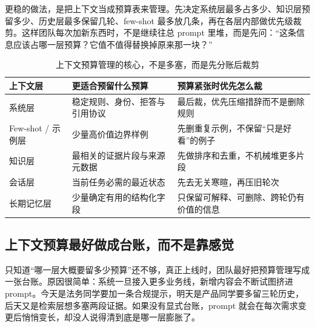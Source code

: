 更稳的做法，是把上下文当成预算表来管理。先决定系统层最多占多少、知识层预留多少、历史层最多保留几轮、few-shot 最多放几条，再在各层内部做优先级裁剪。这样团队每次加新东西时，不是继续往总 prompt 里堆，而是先问：“这条信息应该占哪一层预算？它值不值得替换掉原来那一块？”

\begin{table}[H]
\centering
\small
\begin{tabularx}{\textwidth}{>{\raggedright\arraybackslash}p{2.8cm}>{\raggedright\arraybackslash}p{3.1cm}>{\raggedright\arraybackslash}X}
\toprule
\textbf{上下文层} & \textbf{更适合预留什么预算} & \textbf{预算紧张时优先怎么裁} \\
\midrule
系统层 & 稳定规则、身份、拒答与引用协议 & 最后裁，优先压缩措辞而不是删除规则 \\
Few-shot / 示例层 & 少量高价值边界样例 & 先删重复示例，不保留“只是好看”的例子 \\
知识层 & 最相关的证据片段与来源元数据 & 先做排序和去重，不机械堆更多片段 \\
会话层 & 当前任务必需的最近状态 & 先去无关寒暄，再压旧轮次 \\
长期记忆层 & 少量确定有用的结构化字段 & 只保留可解释、可删除、跨轮仍有价值的信息 \\
\bottomrule
\end{tabularx}
\caption{上下文预算管理的核心，不是多塞，而是先分账后裁剪}
\label{tab:context-budget-allocation}
\end{table}

\subsection{上下文预算最好做成台账，而不是靠感觉}
只知道“哪一层大概要留多少预算”还不够，真正上线时，团队最好把预算管理写成一张台账。原因很简单：系统一旦接入更多业务线，新增内容会不断试图挤进 prompt。今天是法务同学要加一条合规提示，明天是产品同学要多留三轮历史，后天又是检索层想多塞两段证据。如果没有显式台账，prompt 就会在每次需求变更后悄悄变长，却没人说得清到底是哪一层膨胀了。

